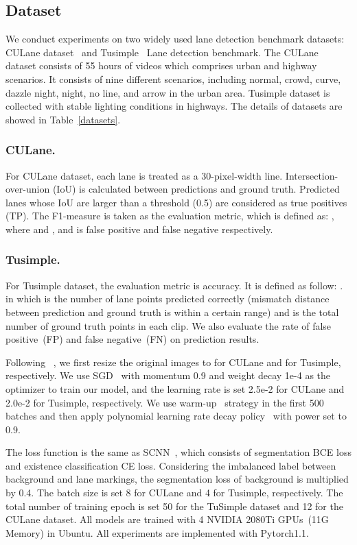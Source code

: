 \documentclass[letterpaper]{article} \usepackage{aaai21}  \usepackage{times}  \usepackage{helvet} \usepackage{courier}  \usepackage[hyphens]{url}  \usepackage{graphicx} \urlstyle{rm} \def\UrlFont{\rm}  \usepackage{natbib}  \usepackage{caption} \frenchspacing  \setlength{\pdfpagewidth}{8.5in}  \setlength{\pdfpageheight}{11in}  \usepackage{amsmath}
\begin{document}
\subsection{Dataset}
We conduct experiments on two widely used lane detection benchmark datasets: CULane dataset~\citep{pan2018spatial} and Tusimple ~Lane detection benchmark\footnotemark.
The CULane dataset consists of 55 hours of videos which comprises urban and highway scenarios. It consists of nine different scenarios, including normal, crowd, curve, dazzle night, night, no line, and arrow in the urban area. Tusimple dataset is collected with stable lighting conditions in highways. The details of datasets are showed in Table~\ref{datasets}.

    
\subsubsection{CULane.} For CULane dataset, each lane is treated as a 30-pixel-width line. Intersection-over-union (IoU) is calculated between predictions and ground truth. Predicted lanes whose IoU are larger than a threshold (0.5) are considered as true positives (TP). The F1-measure is taken as the evaluation metric, which is defined as: , where  and ,  and  is false positive and false negative respectively.
\subsubsection{Tusimple.} For Tusimple dataset, the evaluation metric is accuracy. It is defined as follow: .
in which  is the number of lane points predicted correctly (mismatch distance between prediction and ground truth is within a certain range) and  is the total number of ground truth points in each clip. We also evaluate the rate of false positive~(FP) and false negative~(FN) on prediction results.

Following ~\citep{hou2019learning}, we first resize the original images to  for CULane and  for Tusimple, respectively. We use SGD~\citep{Bottou2010} with momentum 0.9 and weight decay 1e-4 as the optimizer to train our model, and the learning rate is set 2.5e-2 for CULane and 2.0e-2 for Tusimple, respectively. We use warm-up~\citep{Doll2017} strategy in the first 500 batches and then apply polynomial learning rate decay policy~\citep{8929465} with power set to 0.9.

The loss function is the same as SCNN~\citep{pan2018spatial}, which consists of segmentation BCE loss and existence classification CE loss. Considering the imbalanced label between background and lane markings, the segmentation loss of background is multiplied by 0.4. The batch size is set 8 for CULane and 4 for Tusimple, respectively. The total number of training epoch is set 50 for the TuSimple dataset and 12 for the CULane dataset. All models are trained with 4 NVIDIA 2080Ti GPUs~(11G Memory) in Ubuntu. All experiments are implemented with Pytorch1.1.
\end{document}
